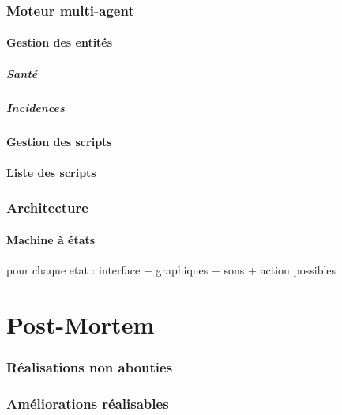 \documentclass[a4paper]{article}
\begin{document}
	\section{Moteur multi-agent}
	
		\subsection{Gestion des entités}
		
			\subsubsection{Santé}
			
			\subsubsection{Incidences}
			
		\subsection{Gestion des scripts}
		
		\subsection{Liste des scripts}
		
	\section{Architecture}
	
		\subsection{Machine à états}
			pour chaque etat :
			interface + graphiques + sons + action possibles
	

  \newpage
  \part{Post-Mortem}
  
	\section{Réalisations non abouties}
	
	\section{Améliorations réalisables}
	
\end{document}
